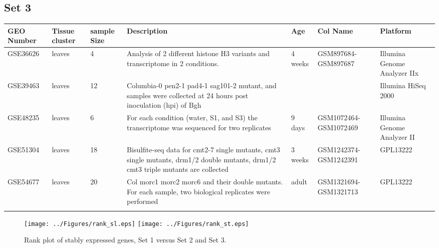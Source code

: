 \documentclass[11pt, a4paper]{article}
\begin{document}
\begin{landscape}
\subsection{Set 3}
\begin{table}
\footnotesize
\centering
\begin{tabular}{p{2cm}p{3cm}p{1cm}p{4cm}p{2.4cm}p{3cm}p{4cm}} \hline
GEO Number &Tissue cluster & sample Size & Description & Age  &Col Name & Platform\\ \hline
GSE36626 &leaves & 4 &Analysis of 2 different histone H3 variants and transcriptome in 2 conditions.  & 4 weeks &GSM897684-GSM897687 & Illumina Genome Analyzer IIx \\ \hdashline
GSE39463 &leaves  &12		&Columbia-0 pen2-1 pad4-1 sag101-2 mutant, and samples were collected at 24 hours post inoculation (hpi) of Bgh & & &Illumina HiSeq 2000 \\ \hdashline
GSE48235 &leaves & 6  & For each condition (water, S1, and S3) the transcriptome was sequenced for two replicates & 9 days & GSM1072464-GSM1072469  &Illumina Genome Analyzer II \\	\hdashline
GSE51304 &leaves  & 18 &Bisulfite-seq data for cmt2-7 single mutants, cmt3 single mutants, drm1/2 double mutants, drm1/2 cmt3 triple mutants are collected  & 3 weeks & GSM1242374-GSM1242391 &GPL13222 \\ \hdashline
GSE54677 & leaves   &20  &Col morc1 morc2 morc6 and their double mutants. For each sample, two biological replicates were performed &adult & GSM1321694-GSM1321713	 &	GPL13222\\ \hdashline
\end{tabular} 
\end{table}
\end{landscape}


 \begin{figure}[h!]
\begin{center}
\texttt{[image: ../Figures/rank\_sl.eps]}
\texttt{[image: ../Figures/rank\_st.eps]}
\caption{\label{fig:scaled_diss} Rank plot of stably expressed genes,  Set 1 versus Set 2 and Set 3.}
\end{center}
\end{figure}

\newpage




\end{document}
